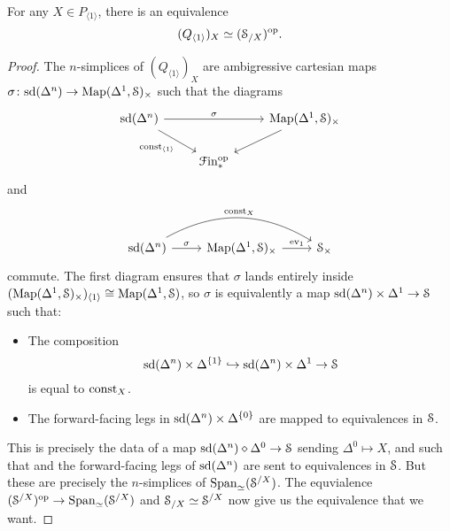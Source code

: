 \documentclass[main.tex]{subfiles}
\begin{document}
\begin{proposition}
  For any $X \in P_{\langle 1 \rangle}$, there is an equivalence
  \begin{equation*}
    (Q_{\langle 1 \rangle})_{X} \simeq (\S_{/X})\op.
  \end{equation*}
\end{proposition}
\begin{proof}
  The $n$-simplices of $(Q_{\langle 1 \rangle})_{X}$ are ambigressive cartesian maps $\sigma\colon \sd(\Delta^{n}) \to \Map(\Delta^{1}, \S)_{\times}$ such that the diagrams
  \begin{equation*}
    \begin{tikzcd}
      \sd(\Delta^{n})
      \arrow[rr, "\sigma"]
      \arrow[dr, swap, "\const_{\langle 1 \rangle}"]
      && \Map(\Delta^{1}, \S)_{\times}
      \arrow[dl]
      \\
      & \Finp\op
    \end{tikzcd}
  \end{equation*}
  and
  \begin{equation*}
    \begin{tikzcd}
      \sd(\Delta^{n})
      \arrow[rr, bend left, "\const_{X}"]
      \arrow[r, "\sigma"]
      & \Map(\Delta^{1}, \S)_{\times}
      \arrow[r, "\ev_{1}"]
      & \S_{\times}
    \end{tikzcd}
  \end{equation*}
  commute. The first diagram ensures that $\sigma$ lands entirely inside $(\Map(\Delta^{1}, \S)_{\times})_{\langle 1 \rangle} \cong \Map(\Delta^{1}, \S)$, so $\sigma$ is equivalently a map $\sd(\Delta^{n}) \times \Delta^{1} \to \S$ such that:
  \begin{itemize}
    \item The composition
      \begin{equation*}
        \sd(\Delta^{n}) \times \Delta^{\{1\}} \hookrightarrow \sd(\Delta^{n}) \times \Delta^{1} \to \S
      \end{equation*}
      is equal to $\const_{X}$.

    \item The forward-facing legs in $\sd(\Delta^{n}) \times \Delta^{\{0\}}$ are mapped to equivalences in $\S$.
  \end{itemize}
  This is precisely the data of a map $\sd(\Delta^{n}) \diamond \Delta^{0} \to \S$ sending $\Delta^{0} \mapsto X$, and such that and the forward-facing legs of $\sd(\Delta^{n})$ are sent to equivalences in $\S$. But these are precisely the $n$-simplices of $\Span_{\simeq}(\S^{/X})$. The equvialence $(\S^{/X})\op \to \Span_{\simeq}(\S^{/X})$ and $\S_{/X} \simeq \S^{/X}$ now give us the equivalence that we want.
\end{proof}
\end{document}
